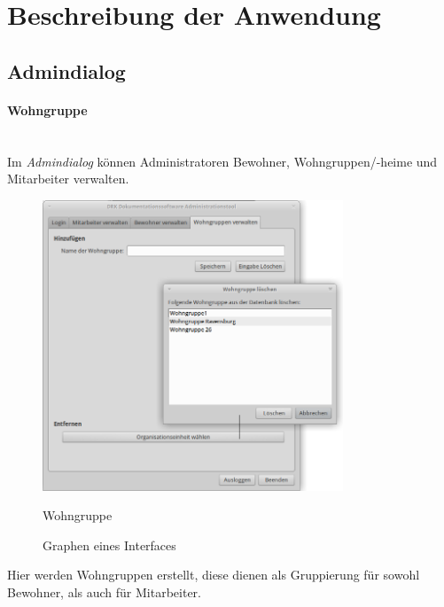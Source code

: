 \section{Beschreibung der Anwendung}
\label{sec:beschreibung}
\subsection{Admindialog}
\paragraph{Wohngruppe}\mbox{}\\
Im \textit{Admindialog} können Administratoren Bewohner, Wohngruppen/-heime und Mitarbeiter verwalten.
\begin{figure}[h]
	\begin{center}
		\includegraphics[keepaspectratio=true, width=0.8\textwidth]{pics/admin3.png}
		\caption{Wohngruppe}
		\label{Admindialog Wohngruppe}
		\caption{Graphen eines Interfaces}
		\label{Admindialog_Mitarbeiter_erstellen}
	\end{center}
\end{figure}
\FloatBarrier
\noindent
Hier werden Wohngruppen erstellt, diese dienen als Gruppierung für sowohl Bewohner, als auch für Mitarbeiter.
\newpage
\noindent
